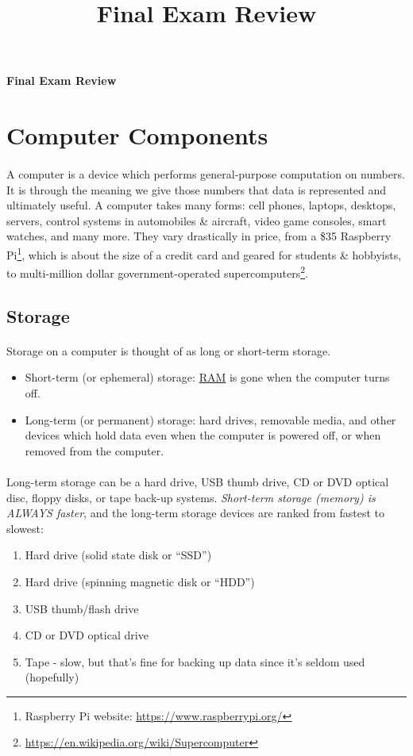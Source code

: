 \documentclass[letter,10pt]{article}
\title{Final Exam Review}
\begin{document}
\huge
\textbf{Final Exam Review}
\normalsize

\tableofcontents

\section{Computer Components}
\paragraph{}A computer is a device which performs general-purpose computation on numbers. It is through the meaning we give those numbers that data is represented and ultimately useful. A computer takes many forms: cell phones, laptops, desktops, servers, control systems in automobiles \& aircraft, video game consoles, smart watches, and many more. They vary drastically in price, from a \$35 Raspberry Pi\footnote{Raspberry Pi website: \url{https://www.raspberrypi.org/}}, which is about the size of a credit card and geared for students \& hobbyists, to multi-million dollar government-operated supercomputers\footnote{\url{https://en.wikipedia.org/wiki/Supercomputer}}.

\subsection{Storage}
\paragraph{}Storage on a computer is thought of as long or short-term storage.
\begin{itemize}
    \item Short-term (or ephemeral) storage: \hyperref[sec:ram]{RAM} is gone when the computer turns off.
    \item Long-term (or permanent) storage: hard drives, removable media, and other devices which hold data even when the computer is powered off, or when removed from the computer.
\end{itemize}

\paragraph{}Long-term storage can be a hard drive, USB thumb drive, CD or DVD optical disc, floppy disks, or tape back-up systems. \textit{Short-term storage (memory) is ALWAYS faster}, and the long-term storage devices are ranked from fastest to slowest:
\begin{enumerate}
    \item Hard drive (solid state disk or ``SSD'')
    \item Hard drive (spinning magnetic disk or ``HDD'')
    \item USB thumb/flash drive
    \item CD or DVD optical drive
    \item Tape - slow, but that's fine for backing up data since it's seldom used (hopefully)
\end{enumerate}
\end{document}
